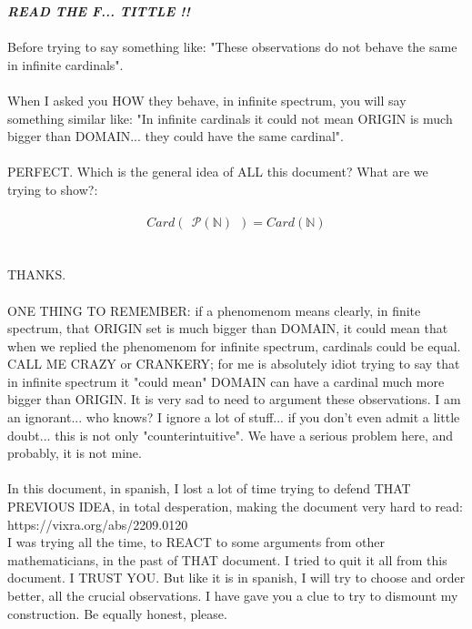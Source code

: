 		\noindent
		\textbf{\textit{		READ THE F... TITTLE !!}}
		\\\\
		
		\noindent
		Before trying to say something like: "These observations do not behave the same in infinite cardinals".
		\\\\
		
		\noindent
		When I asked you HOW they behave, in infinite spectrum, you will say something similar like: "In infinite cardinals it could not mean ORIGIN is much bigger than DOMAIN... they could have the same cardinal".
		\\\\
		
		\noindent
		PERFECT. Which is the general idea of ALL this document? What are we trying to show?:\\\\
		$$ Card(\:\: \mathcal{P(\mathbb{N})} \:\:) = Card (\mathbb{N}) $$
		\\\\
		
		\noindent
		THANKS.
		\\\\
		
		\noindent
		ONE THING TO REMEMBER: if a phenomenom means clearly, in finite spectrum, that ORIGIN set is much bigger than DOMAIN, it could mean that when we replied the phenomenom for infinite spectrum, cardinals could be equal. CALL ME CRAZY or CRANKERY; for me is absolutely idiot trying to say that in infinite spectrum it "could mean" DOMAIN can have a cardinal much more bigger than ORIGIN. It is very sad to need to argument these observations. I am an ignorant... who knows? I ignore a lot of stuff... if you don't even admit a little doubt... this is not only "counterintuitive". We have a serious problem here, and probably, it is not mine.
		\\\\
		
		\noindent
		In this document, in spanish, I lost a lot of time trying to defend THAT PREVIOUS IDEA, in total desperation, making the document very hard to read:\\
		https://vixra.org/abs/2209.0120 \\
		I was trying all the time, to REACT to some arguments from other mathematicians, in the past of THAT document. I tried to quit it all from this document. I TRUST YOU. But like it is in spanish, I will try to choose and order better, all the crucial observations. I have gave you a clue to try to dismount my construction. Be equally honest, please.
		\\\\
		

